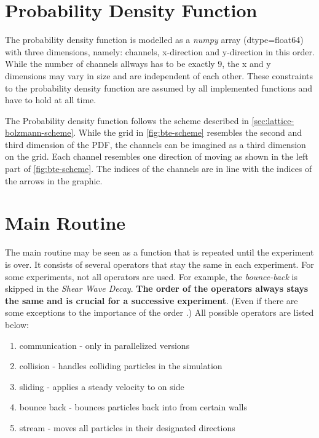 \section{Probability Density Function}
The probability density function is modelled as a \textit{numpy} array (dtype=float64) with three dimensions, namely: channels, x-direction and y-direction in this order.
While the number of channels allways has to be exactly 9, the x and y dimensions may vary in size and are independent of each other.
These constraints to the probability density function are assumed by all implemented functions and have to hold at all time.
\newline

The Probability density function follows the scheme described in \cref{sec:lattice-bolzmann-scheme}.
While the grid in \cref{fig:bte-scheme} resembles the second and third dimension of the PDF, the channels can be imagined as a third dimension on the grid.
Each channel resembles one direction of moving as shown in the left part of \cref{fig:bte-scheme}.
The indices of the channels are in line with the indices of the arrows in the graphic.


\section{Main Routine}\label{sec:main-routine}
The main routine may be seen as a function that is repeated until the experiment is over.
It consists of several operators that stay the same in each experiment.
For some experiments, not all operators are used.
For example, the \textit{bounce-back} is skipped in the \textit{Shear Wave Decay}.
\textbf{The order of the operators always stays the same and is crucial for a successive experiment}.
(Even if there are some exceptions to the importance of the order \cite{lecture, 10.1093/oso/9780199592357.001.0001, timm2016lattice}.)
All possible operators are listed below:
\begin{enumerate}
    \item communication - only in parallelized versions
    \item collision - handles colliding particles in the simulation
    \item sliding - applies a steady velocity to on side
    \item bounce back - bounces particles back into from certain walls
    \item stream - moves all particles in their designated directions
\end{enumerate}

